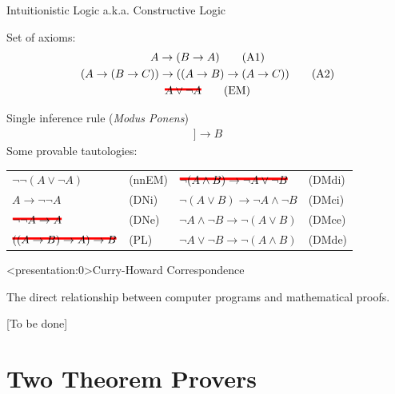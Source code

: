 \documentclass[aspectratio=169, 12pt, fleqn]{beamer}
\newcommand\hcancel[2][black]{\setbox0=\hbox{$#2$}%
\rlap{\raisebox{.45\ht0}{\textcolor{#1}{\rule{\wd0}{2pt}}}}#2}
\begin{document}
\begin{frame}{Intuitionistic Logic}
{a.k.a. Constructive Logic}

\textcolor{dkblue}{Set of axioms:}
\begin{gather}
A \rightarrow (B \rightarrow A)
\tag{A1} \\
(A \rightarrow (B \rightarrow C)) \rightarrow ((A \rightarrow B) \rightarrow (A \rightarrow C))
\tag{A2} \\
\hcancel[red]{ A \lor \neg A }
\tag{EM} 
\end{gather}

\textcolor{dkblue}{Single inference rule (\textit{Modus Ponens})}
\begin{gather} 
[\![ A, A \rightarrow B ]\!] \longrightarrow B
\tag{MP}
\end{gather}
\textcolor{dkblue}{Some provable tautologies:}

\begin{tabular}{p{.32\linewidth}p{.2\linewidth} p{.3\linewidth}p{.25\linewidth}}
  $\neg \neg (A \lor \neg A)$ & (nnEM) & $\hcancel[red]{ \neg (A \land B) \rightarrow \neg A \lor \neg B }$ & (DMdi) \\
  $A \rightarrow \neg \neg A$ & (DNi)  & $\neg (A \lor B) \rightarrow \neg A \land \neg B $ & (DMci) \\
  $\hcancel[red]{ \neg \neg A \rightarrow A }$ & (DNe)  & $\neg A \land \neg B \rightarrow  \neg (A \lor B) $ & (DMce) \\
  $\hcancel[red]{ ((A \rightarrow B) \rightarrow A) \rightarrow B }$ & (PL) & $\neg A \lor \neg B \rightarrow  \neg (A \land B) $ & (DMde)
\end{tabular}

\end{frame}

\begin{frame}<presentation:0>{Curry-Howard Correspondence}

The direct relationship between computer programs and mathematical proofs.

[To be done]
\end{frame}


\section{Two Theorem Provers}
\end{document}
